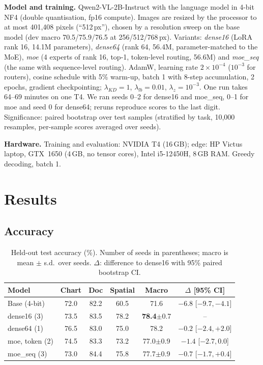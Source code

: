 \documentclass[conference]{IEEEtran}
\begin{document}
\textbf{Model and training.} Qwen2-VL-2B-Instruct with the language model in 4-bit NF4 (double
quantisation, fp16 compute). Images are resized by the processor to at most 401{,}408 pixels
(``512\,px''), chosen by a resolution sweep on the base model (dev macro 70.5/75.9/76.5 at
256/512/768\,px). Variants: \emph{dense16} (LoRA rank 16, 14.1M parameters), \emph{dense64} (rank 64,
56.4M, parameter-matched to the MoE), \emph{moe} (4 experts of rank 16, top-1, token-level routing, 56.6M)
and \emph{moe\_seq} (the same with sequence-level routing). AdamW, learning rate $2\times10^{-4}$
($10^{-3}$ for routers), cosine schedule with 5\% warm-up, batch 1 with 8-step accumulation, 2 epochs,
gradient checkpointing; $\lambda_{KD}=1$, $\lambda_{lb}=0.01$, $\lambda_z=10^{-3}$. One run takes 64--69
minutes on one T4. We ran seeds 0--2 for dense16 and moe\_seq, 0--1 for moe and seed 0 for
dense64; reruns reproduce scores to the last digit. Significance: paired bootstrap over test samples (stratified by
task, 10{,}000 resamples, per-sample scores averaged over seeds).

\textbf{Hardware.} Training and evaluation: NVIDIA T4 (16\,GB); edge: HP Victus laptop,
GTX~1650 (4\,GB, no tensor cores), Intel i5-12450H, 8\,GB RAM. Greedy decoding, batch 1.

\section{Results}
\subsection{Accuracy}
\begin{table}[t]
\centering
\caption{Held-out test accuracy (\%). Number of seeds in parentheses; macro is mean $\pm$ s.d.\ over
seeds. $\Delta$: difference to dense16 with 95\% paired bootstrap CI.}
\label{tab:main}
\setlength{\tabcolsep}{2.6pt}
\begin{tabular}{lccccc}
\toprule
Model & Chart & Doc & Spatial & Macro & $\Delta$ [95\% CI] \\
\midrule
Base (4-bit) & 72.0 & 82.2 & 60.5 & 71.6 & $-6.8$ [$-9.7,-4.1$] \\
dense16 (3) & 73.5 & 83.5 & 78.2 & \textbf{78.4}\scriptsize{$\pm$0.7} & -- \\
dense64 (1) & 76.5 & 83.0 & 75.0 & 78.2 & $-0.2$ [$-2.4,+2.0$] \\
moe, token (2) & 74.5 & 83.3 & 73.2 & 77.0\scriptsize{$\pm$0.9} & $-1.4$ [$-2.7,0.0$] \\
moe\_seq (3) & 73.0 & 84.4 & 75.8 & 77.7\scriptsize{$\pm$0.9} & $-0.7$ [$-1.7,+0.4$] \\
\bottomrule
\end{tabular}
\end{table}
\end{document}
